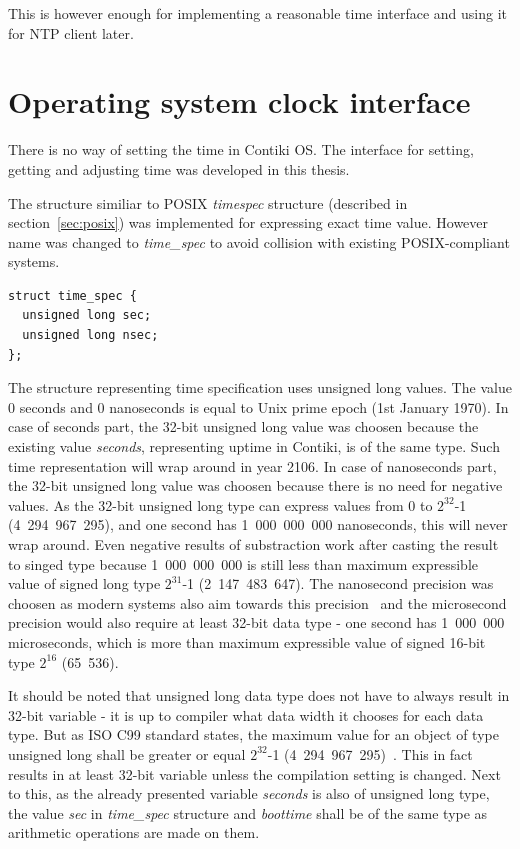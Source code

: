 
This is however enough for implementing a reasonable time interface and using it for NTP client later.



\section{Operating system clock interface}
There is no way of setting the time in Contiki OS.
The interface for setting, getting and adjusting time was developed in this thesis.

The structure similiar to POSIX {\it{timespec}} structure (described in section~\ref{sec:posix})
was implemented for expressing exact time value.
However name was changed to {\it{time\_spec}} to avoid collision with existing POSIX-compliant systems.
\begin{lstlisting}
struct time_spec {
  unsigned long sec;
  unsigned long nsec;
};
\end{lstlisting}
The structure representing time specification uses unsigned long values.
The value 0 seconds and 0 nanoseconds is equal to Unix prime epoch (1st January 1970).
In case of seconds part, the 32-bit unsigned long value was choosen because the existing value
{\it{seconds}}, representing uptime in Contiki, is of the same type.
Such time representation will wrap around in year 2106.
In case of nanoseconds part, the 32-bit unsigned long value was choosen because there is no need
for negative values.
As the 32-bit unsigned long type can express values from 0 to $2^{32}$-1 (4~294~967~295),
and one second has 1~000~000~000 nanoseconds, this will never wrap around.
Even negative results of substraction work after casting the result to singed type
because 1~000~000~000 is still less than maximum expressible value of signed long type $2^{31}$-1 (2~147~483~647).
The nanosecond precision was choosen as modern systems also aim towards this precision~\cite{posix,ntp-precision} and
the microsecond precision would also require at least 32-bit data type -
one second has 1~000~000 microseconds, which is more than maximum expressible value of signed 16-bit
type $2^{16}$ (65~536).

It should be noted that unsigned long data type does not have to always result in 32-bit variable -
it is up to compiler what data width it chooses for each data type.
But as ISO C99 standard states, the maximum value for an object of type unsigned long
shall be greater or equal $2^{32}$-1 (4~294~967~295)~\cite{c99}.
This in fact results in at least 32-bit variable unless the compilation setting is changed.
Next to this, as the already presented variable {\it{seconds}} is also of unsigned long type,
the value {\it{sec}} in {\it{time\_spec}} structure and {\it{boottime}}
shall be of the same type as arithmetic operations are made on them.

